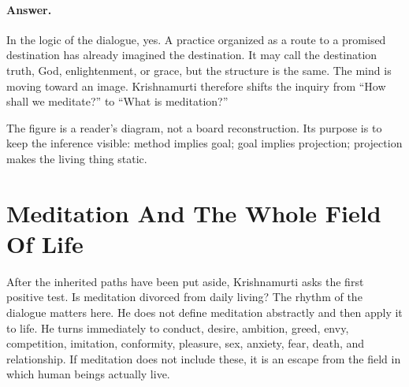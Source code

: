 \paragraph{Answer.}
In the logic of the dialogue, yes. A practice organized as a route to a promised destination has already imagined the destination. It may call the destination truth, God, enlightenment, or grace, but the structure is the same. The mind is moving toward an image. Krishnamurti therefore shifts the inquiry from ``How shall we meditate?'' to ``What is meditation?''

\begin{figure}
\centering
{}
\end{figure}

The figure is a reader's diagram, not a board reconstruction. Its purpose is to keep the inference visible: method implies goal; goal implies projection; projection makes the living thing static.

\section{Meditation And The Whole Field Of Life}

After the inherited paths have been put aside, Krishnamurti asks the first positive test. Is meditation divorced from daily living? The rhythm of the dialogue matters here. He does not define meditation abstractly and then apply it to life. He turns immediately to conduct, desire, ambition, greed, envy, competition, imitation, conformity, pleasure, sex, anxiety, fear, death, and relationship. If meditation does not include these, it is an escape from the field in which human beings actually live.

